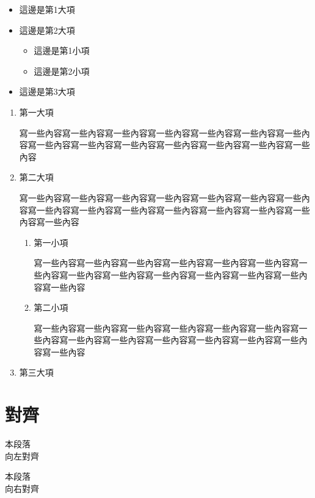 \begin{itemize}
    \item 這邊是第1大項
    \item 這邊是第2大項
          \begin{itemize}
              \item 這邊是第1小項
              \item 這邊是第2小項
          \end{itemize}
    \item 這邊是第3大項
\end{itemize}

\begin{enumerate}
    \item 第一大項
          \par 寫一些內容寫一些內容寫一些內容寫一些內容寫一些內容寫一些內容寫一些內容寫一些內容寫一些內容寫一些內容寫一些內容寫一些內容寫一些內容寫一些內容
    \item 第二大項
          \par 寫一些內容寫一些內容寫一些內容寫一些內容寫一些內容寫一些內容寫一些內容寫一些內容寫一些內容寫一些內容寫一些內容寫一些內容寫一些內容寫一些內容寫一些內容
          \begin{enumerate}
              \item 第一小項
                    \par 寫一些內容寫一些內容寫一些內容寫一些內容寫一些內容寫一些內容寫一些內容寫一些內容寫一些內容寫一些內容寫一些內容寫一些內容寫一些內容寫一些內容
              \item 第二小項
                    \par 寫一些內容寫一些內容寫一些內容寫一些內容寫一些內容寫一些內容寫一些內容寫一些內容寫一些內容寫一些內容寫一些內容寫一些內容寫一些內容寫一些內容
          \end{enumerate}
    \item 第三大項
\end{enumerate}

\newpage

\section{對齊}
\begin{flushleft}
    本段落\\
    向左對齊
\end{flushleft}

\begin{flushright}
    本段落\\
    向右對齊
\end{flushright}

